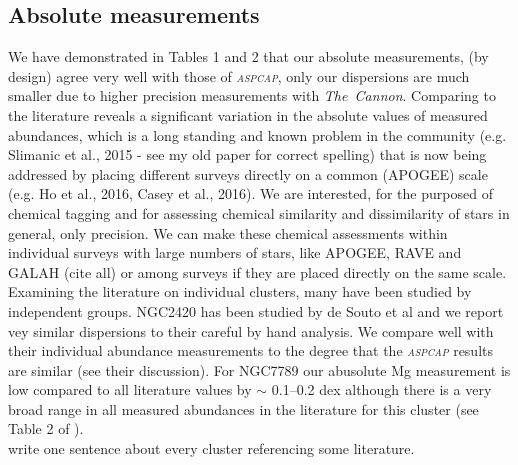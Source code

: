 \documentclass[14pt, preprint2]{aastex6}
\newcommand{\project}[1]{\textsl{#1}}
\newcommand{\tc}{\project{The~Cannon}}
\newcommand{\aspcap}{\project{\textsc{aspcap}}}
\begin{document}
\subsection{Absolute measurements}

We have demonstrated in Tables 1 and 2 that our absolute measurements, (by design) agree very well with those of \aspcap, only our dispersions are much smaller due to higher precision measurements with \tc. Comparing to the literature reveals a significant variation in the absolute values of measured abundances, which is a long standing and known problem in the community  (e.g. Slimanic et al., 2015 - see my old paper for correct spelling) that is now being addressed by placing different surveys directly on a common (APOGEE) scale (e.g. Ho et al., 2016, Casey et al., 2016). We are interested, for the purposed of chemical tagging and for assessing chemical similarity and dissimilarity of stars in general, only precision. We can make these chemical assessments within individual surveys with large numbers of stars, like APOGEE, RAVE and GALAH (cite all) or among surveys if they are placed directly on the same scale. 
Examining the literature on individual clusters, many have been studied by independent groups. NGC2420 has been studied by de Souto et al and we report vey similar dispersions to their careful by hand analysis. We compare well with their individual abundance measurements to the degree that the \aspcap
 results are similar (see their discussion). For NGC7789 our abusolute Mg measurement is low compared to all literature values by $\sim$ 0.1--0.2 dex although there is a very broad range in all measured abundances in the literature for this cluster (see Table 2 of \citet{Overbeek2015}). \\
 write one sentence about every cluster referencing some literature.\\


\end{document}
